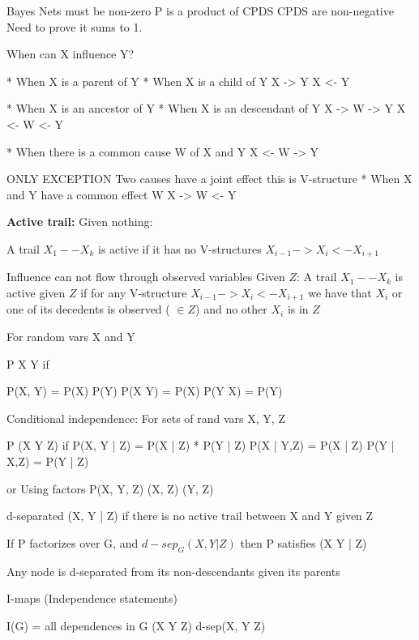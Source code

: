 Bayes Nets must be non-zero
P is a product of CPDS CPDS are non-negative
Need to prove it sums to 1.


When can X influence Y?

 * When X is a parent of Y
 * When X is a child of Y
 X -> Y
 X <- Y

 * When X is an ancestor of Y
 * When X is an descendant of Y
 X -> W -> Y
 X <- W <- Y

 * When there is a common cause W of X and Y
 X <- W -> Y

 ONLY EXCEPTION
 Two causes have a joint effect
 this is V-structure
 * When X and Y have a common effect W
 X -> W <- Y


\textbf{Active trail:}
Given nothing:

    A trail $X_1 -- X_k$ is active if it has no V-structures
    $X_{i-1} -> X_i <- X_{i+1}$

Influence can not flow through observed variables
Given $Z$:
     A trail $X_1 -- X_k$ is active given $Z$ if 
     for any V-structure 
     $X_{i-1} -> X_i <- X_{i+1}$
     we have that $X_i$ or one of its decedents is observed (\ie{} $\in Z$)
     and no other $X_i$ is in $Z$



 For random vars X and Y

 P \models X \perp Y if 

 P(X, Y) = P(X) P(Y)
 P(X \given Y) = P(X) 
 P(Y \given X) = P(Y) 


 Conditional independence:
 For sets of rand vars X, Y, Z

 P \models (X \perp Y \given Z) if 
 P(X, Y | Z) = P(X | Z) * P(Y | Z)
 P(X | Y,Z) = P(X | Z)
 P(Y | X,Z) = P(Y | Z)

 or Using factors
 P(X, Y, Z) \prop {}(X, Z) (Y, Z)


 d-separated (X, Y | Z) if there is no active trail between X and Y given Z


 If P factorizes over G, and $d-sep_G(X, Y | Z)$ then 
 P satisfies (X \perp Y | Z) 


 Any node is d-separated from its non-descendants given its parents


 I-maps (Independence statements)

 I(G) = all dependences in G (X \perp Y \given Z) \where d-sep(X, Y \given Z)


